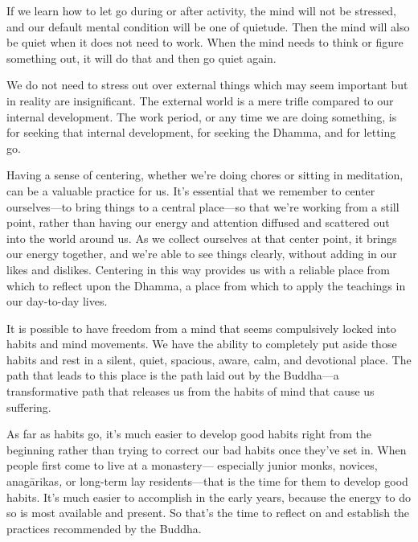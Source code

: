 If we learn how to let go during or after activity, the mind will not 
be stressed, and our default mental condition will be one of quietude. 
Then the mind will also be quiet when it does not need to work. When 
the mind needs to think or figure something out, it will do that and 
then go quiet again.

We do not need to stress out over external things which may seem 
important but in reality are insignificant. The external world is a 
mere trifle compared to our internal development. The work period, or 
any time we are doing something, is for seeking that internal 
development, for seeking the Dhamma, and for letting go.


Having a sense of centering, whether we're doing chores or sitting in 
meditation, can be a valuable practice for us. It's essential that we 
remember to center ourselves---to bring things to a central place---so 
that we're working from a still point, rather than having our energy 
and attention diffused and scattered out into the world around us. As 
we collect ourselves at that center point, it brings our energy 
together, and we're able to see things clearly, without adding in our 
likes and dislikes. Centering in this way provides us with a reliable 
place from which to reflect upon the Dhamma, a place from which to 
apply the teachings in our day-to-day lives.


It is possible to have freedom from a mind that seems compulsively 
locked into habits and mind movements. We have the ability to 
completely put aside those habits and rest in a silent, quiet, 
spacious, aware, calm, and devotional place. The path that leads to 
this place is the path laid out by the Buddha---a transformative path 
that releases us from the habits of mind that cause us suffering.

As far as habits go, it's much easier to develop good habits right from 
the beginning rather than trying to correct our bad habits once they've 
set in. When people first come to live at a monastery--- especially 
junior monks, novices, anagārikas\emph{,} or long-term lay 
residents---that is the time for them to develop good habits. It's much 
easier to accomplish in the early years, because the energy to do so is 
most available and present. So that's the time to reflect on and 
establish the practices recommended by the Buddha.

